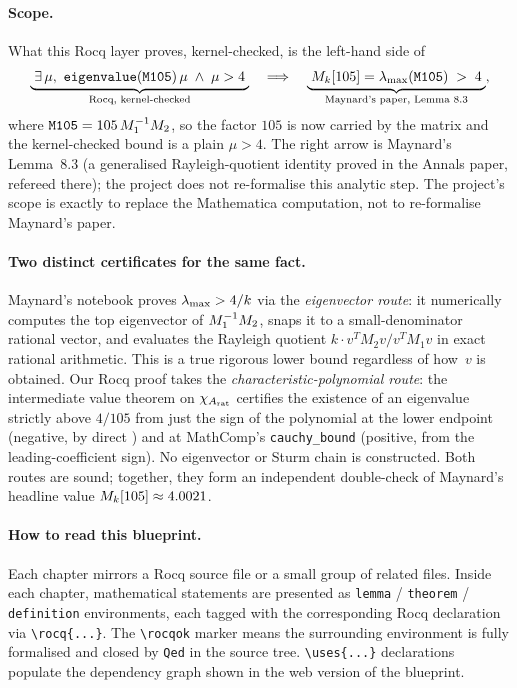 \paragraph{Scope.}
What this Rocq layer proves, kernel-checked, is the left-hand side of
\[
\underbrace{\;\exists\,\mu,\ \texttt{eigenvalue}(\texttt{M105})\,\mu \;\wedge\; \mu > 4\;}_{\text{Rocq, kernel-checked}}
\quad\Longrightarrow\quad
\underbrace{\;\Mk[105] = \lammax(\texttt{M105}) \;>\; 4\;}_{\text{Maynard's paper, Lemma 8.3}},
\]
where $\texttt{M105} = 105\,M_1^{-1}M_2$, so the factor $105$ is now
carried by the matrix and the kernel-checked bound is a plain $\mu > 4$.
The right arrow is Maynard's Lemma~8.3 (a generalised Rayleigh-quotient
identity proved in the Annals paper, refereed there); the project does
not re-formalise this analytic step. The project's scope is exactly to
replace the Mathematica computation, not to re-formalise Maynard's paper.

\paragraph{Two distinct certificates for the same fact.}
Maynard's notebook proves $\lambda_{\max} > 4/k$ via the \emph{eigenvector
route}: it numerically computes the top eigenvector of $M_1^{-1}M_2$,
snaps it to a small-denominator rational vector, and evaluates the
Rayleigh quotient $k\cdot v^T M_2 v / v^T M_1 v$ in exact rational
arithmetic. This is a true rigorous lower bound regardless of how~$v$
is obtained. Our Rocq proof takes the \emph{characteristic-polynomial
route}: the intermediate value theorem on $\chi_{A_{\mathrm{rat}}}$
certifies the existence of an eigenvalue strictly above $4/105$ from
just the sign of the polynomial at the lower endpoint (negative, by
direct \vmcompute{}) and at MathComp's \texttt{cauchy\_bound} (positive,
from the leading-coefficient sign). No eigenvector or Sturm chain is
constructed. Both routes are sound; together, they form an independent
double-check of Maynard's headline value $M_k[105] \approx 4.0021$.

\paragraph{How to read this blueprint.}
Each chapter mirrors a Rocq source file or a small group of related
files. Inside each chapter, mathematical statements are presented as
\texttt{lemma} / \texttt{theorem} / \texttt{definition} environments,
each tagged with the corresponding Rocq declaration via
\verb|\rocq{...}|. The \verb|\rocqok| marker means the surrounding
environment is fully formalised and closed by \verb|Qed| in the source
tree. \verb|\uses{...}| declarations populate the dependency graph
shown in the web version of the blueprint.

